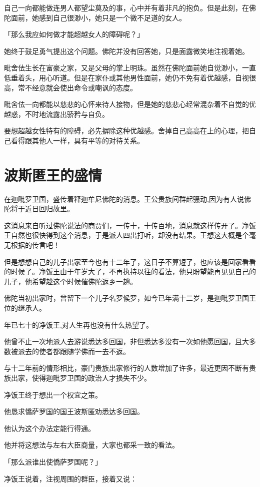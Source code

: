 \documentclass[twoside,openany]{book}
\begin{document}
自己一向都能做连男人都望尘莫及的事，心中并有着非凡的抱负。但是此刻，在佛陀面前，她感到自己很渺小，她只是一个微不足道的女人。

「那么我应如何做才能超越女人的障碍呢？」

她终于鼓足勇气提出这个问题。佛陀并没有回答她，只是面露微笑地注视着她。

毗舍佉生长在富豪之家，又是父母的掌上明珠。虽然在佛陀面前她自觉渺小，一直低垂着头，用心听道。但是在家仆或其他男性面前，她仍不免有着优越感，自视很高，常不经意就会使出命令或嘲讽的态度。

毗舍佉一向都能以慈悲的心怀来待人接物，但是她的慈悲心经常混杂着不自觉的优越惑，不时地流露出骄矜与自负。

要想超越女性特有的障碍，必先摒除这种优越感。舍掉自己高高在上的心理，把自己看得跟其他人一样，具有平等的对待关系。

\section{波斯匿王的盛情}\label{sec7.3}

在迦毗罗卫国，盛传着释迦牟尼佛陀的消息。王公贵族间群起骚动,因为有人说佛陀将于近日回归故里。

这消息来自听过佛陀说法的商贾们，一传十，十传百地，消息就这样传开了。净饭王自然也很快得到这个消息，于是派人四出打听，却没有结果。王想这大概是个毫无根据的传言吧！

但是想想自己的儿子出家至今也有十二年了，这日子不算短了，也应该是回家看看的时候了。净饭王由于年岁大了，不再执持以往的看法，他只盼望能再见见自己的儿子，他希望趁这个时候催佛陀返乡一趟。

佛陀当初出家时，曾留下一个儿子名罗候罗，如今已年满十二岁，是迦毗罗卫国王位的继承人。

年已七十的净饭王,对人生再也没有什么热望了。

他曾不止一次地派人去游说悉达多回国，非但悉达多没有一次如他愿回国，且大多数被派去的使者都跟随学佛而一去不返。

与十二年前的情形相比，豪门贵族出家修行的人数增加了许多，最近更因不断有贵族出家，使得迦毗罗卫国的政治人才损失不少。

净饭王终于想出一个权宜之策。

他恳求憍萨罗国的国王波斯匿劝悉达多回国。

他认为这个办法定能行得通。

他并将这想法与左右大臣商量，大家也都采一致的看法。

「那么派谁出使憍萨罗国呢？」

净饭王说着，注视周围的群臣，接着又说：
\end{document}
